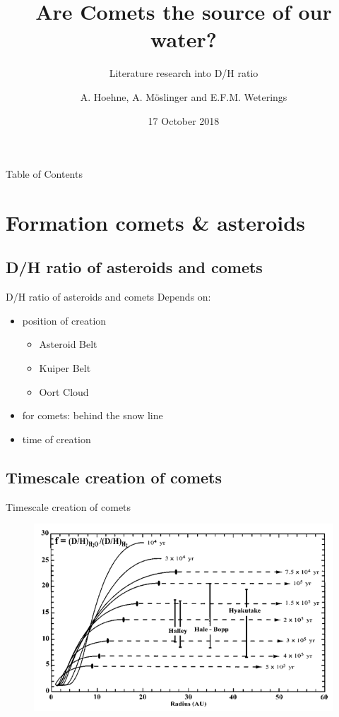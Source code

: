 \documentclass[11pt, aspectratio=169]{beamer}
\author{A. Hoehne, A. M\"{o}slinger and E.F.M. Weterings}
\title{Are Comets the source of our water?}
\subtitle{Literature research into D/H ratio}
\institute{Lule\aa \ University of Technology}
\date{17 October 2018}
\begin{document}
\begin{frame}
\titlepage
\end{frame}

\begin{frame}[t]{Table of Contents}
\tableofcontents[
    currentsection,
    sectionstyle=show/show,
    subsectionstyle=show/show,
  ]
\end{frame}



\section{Formation comets \& asteroids}
\subsection{D/H ratio of asteroids and comets}
\begin{frame}[t]{D/H ratio of asteroids and comets}
Depends on:
\begin{itemize}
	\item position of creation
	\begin{itemize}
		\item Asteroid Belt
		\item Kuiper Belt
		\item Oort Cloud
	\end{itemize}
	\item for comets: behind the snow line
	\item time of creation
\end{itemize}
\end{frame}


\subsection{Timescale creation of comets}
\begin{frame}[t]{Timescale creation of comets}
\begin{figure}
	\centering
	\includegraphics[height=0.7\textheight]{figures/D_H_distance_time}
\end{figure}
\end{frame}
\end{document}
